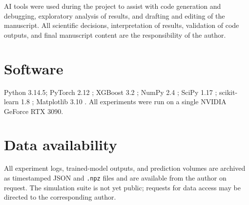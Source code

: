 \documentclass[fleqn,usenatbib]{rasti}
\begin{document}
AI tools were used during the project to assist with code generation
and debugging, exploratory analysis of results, and drafting and
editing of the manuscript. All scientific decisions, interpretation of
results, validation of code outputs, and final manuscript content are
the responsibility of the author.

\section*{Software}

Python 3.14.5; PyTorch 2.12 \citep{Paszke2019}; XGBoost 3.2
\citep{Chen2016}; NumPy 2.4 \citep{Harris2020}; SciPy 1.17
\citep{Virtanen2020}; scikit-learn 1.8 \citep{Pedregosa2011};
Matplotlib 3.10 \citep{Hunter2007}. All experiments were run on a
single NVIDIA GeForce RTX 3090.

\section*{Data availability}

All experiment logs, trained-model outputs, and prediction volumes are
archived as timestamped JSON and \texttt{.npz} files and are available
from the author on request. The simulation suite is not yet public;
requests for data access may be directed to the corresponding author.




\label{lastpage}
\end{document}
